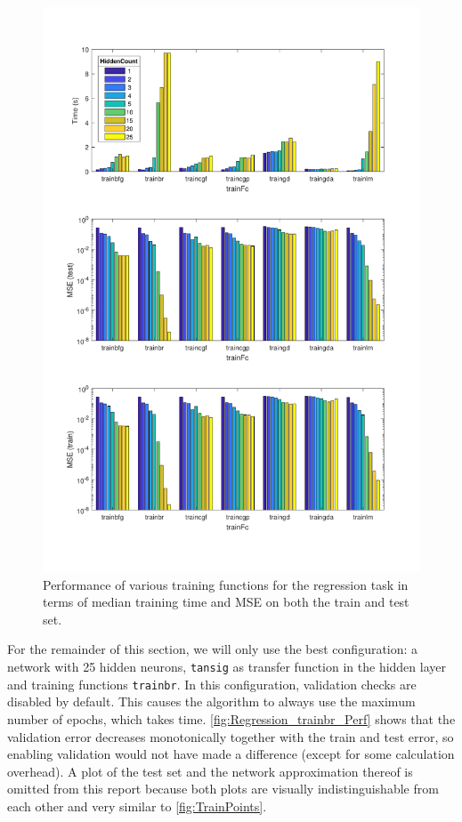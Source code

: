 \documentclass[a4, 10pt, twoside, twocolumn]{article}
\numberwithin{figure}{section}
\begin{document}
\begin{figure}[ht]
    \includegraphics[width=\linewidth]{img/Regression_HiddenCount.pdf}
     \caption{Performance of various training functions for the regression task in terms of median training time and MSE on both the train and test set.}
    \label{fig:Regression_Perf}
\end{figure}

For the remainder of this section, we will only use the best configuration: a network with 25 hidden neurons, \texttt{tansig} as transfer function in the hidden layer and training functions \texttt{trainbr}. In this configuration, validation checks are disabled by default. This causes the algorithm to always use the maximum number of epochs, which takes time. \autoref{fig:Regression_trainbr_Perf} shows that the validation error decreases monotonically together with the train and test error, so enabling validation would not have made a difference (except for some calculation overhead). A plot of the test set and the network approximation thereof is omitted from this report because both plots are visually indistinguishable from each other and very similar to \autoref{fig:TrainPoints}.
\end{document}
